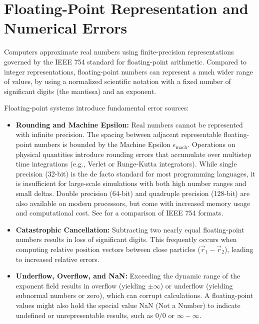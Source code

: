 \section{Floating-Point Representation and Numerical Errors}\label{sec:floating-point}

Computers approximate real numbers using finite-precision representations 
governed by the IEEE 754 standard for floating-point arithmetic\cite{IEEE754_2019}.
Compared to integer representations, floating-point numbers can represent a much wider range of values,
by using a normalized scientific notation with a fixed number of significant digits (the mantissa) and an exponent.

Floating-point systems introduce fundamental error sources\cite{Goldberg1991FloatingPoint}:
\begin{itemize}
\item \textbf{Rounding and Machine Epsilon:} 
    Real numbers cannot be represented with infinite precision. 
    The spacing between adjacent representable floating-point numbers is bounded by the Machine Epsilon $\epsilon_{\text{mach}}$.
    Operations on physical quantities introduce rounding errors that accumulate over multistep time integrations 
    (e.g., Verlet or Runge-Kutta integrators).
    While single precision (32-bit) is the de facto standard for most programming languages, 
    it is insufficient for large-scale simulations with both high number ranges and small deltas.
    Double precision (64-bit) and quadruple precision (128-bit) are also available on modern processors, 
    but come with increased memory usage and computational cost. 
    See  for a comparison of IEEE 754 formats.
\item \textbf{Catastrophic Cancellation:}
    Subtracting two nearly equal floating-point numbers results in loss of significant digits. 
    This frequently occurs when computing relative position vectors between close particles 
    ($\vec{r}_1 - \vec{r}_2$), leading to increased relative errors.
\item \textbf{Underflow, Overflow, and NaN:}
    Exceeding the dynamic range of the exponent field results in overflow (yielding $\pm\infty$) 
    or underflow (yielding subnormal numbers or zero), which can corrupt calculations.
    A floating-point values might also hold the special value NaN (Not a Number) to indicate undefined or unrepresentable results,
    such as $0/0$ or $\infty - \infty$.
\end{itemize}


